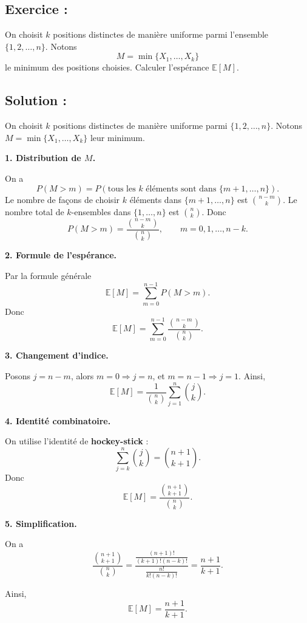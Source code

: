 \subsection*{Exercice :}

\begin{exerciseBox}
On choisit $k$ positions distinctes de manière uniforme parmi l’ensemble
$\{1,2,\dots,n\}$.
Notons
\[
M = \min\{X_1,\dots,X_k\}
\]
le minimum des positions choisies.
Calculer l’espérance $\mathbb{E}[M]$.
\end{exerciseBox}

\subsection*{Solution :}


On choisit $k$ positions distinctes de manière uniforme parmi $\{1,2,\dots,n\}$.
Notons $M = \min\{X_1,\dots,X_k\}$ leur minimum.

\medskip
\textbf{1. Distribution de $M$.}

On a
\[
P(M > m) = P(\text{tous les $k$ éléments sont dans } \{m+1,\dots,n\}).
\]
Le nombre de façons de choisir $k$ éléments dans $\{m+1,\dots,n\}$ est
\(\binom{n-m}{k}\).
Le nombre total de $k$-ensembles dans $\{1,\dots,n\}$ est
\(\binom{n}{k}\).
Donc
\[
P(M > m) = \frac{\binom{n-m}{k}}{\binom{n}{k}}, 
\qquad m=0,1,\dots,n-k.
\]

\medskip
\textbf{2. Formule de l'espérance.}

Par la formule générale
\[
\mathbb{E}[M] = \sum_{m=0}^{n-1} P(M > m).
\]
Donc
\[
\mathbb{E}[M] = \sum_{m=0}^{n-1} \frac{\binom{n-m}{k}}{\binom{n}{k}}.
\]

\medskip
\textbf{3. Changement d’indice.}

Posons $j = n-m$, alors $m=0 \Rightarrow j=n$, et $m=n-1 \Rightarrow j=1$.
Ainsi,
\[
\mathbb{E}[M] = \frac{1}{\binom{n}{k}} \sum_{j=1}^{n} \binom{j}{k}.
\]

\medskip
\textbf{4. Identité combinatoire.}

On utilise l’identité de \textbf{hockey-stick} :
\[
\sum_{j=k}^{n} \binom{j}{k} = \binom{n+1}{k+1}.
\]
Donc
\[
\mathbb{E}[M] = \frac{\binom{n+1}{k+1}}{\binom{n}{k}}.
\]

\medskip
\textbf{5. Simplification.}

On a
\[
\frac{\binom{n+1}{k+1}}{\binom{n}{k}}
= \frac{\frac{(n+1)!}{(k+1)!(n-k)!}}{\frac{n!}{k!(n-k)!}}
= \frac{n+1}{k+1}.
\]

\medskip
Ainsi,
\[
\boxed{\mathbb{E}[M] = \frac{n+1}{k+1}}.
\]






